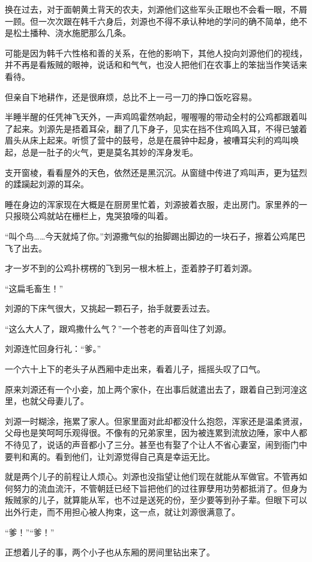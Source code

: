 换在过去，对于面朝黄土背天的农夫，刘源他们这些军头正眼也不会看一眼，不屑一顾。但一次次跟在韩千六身后，刘源也不得不承认种地的学问的确不简单，绝不是松土播种、浇水施肥那么几条。

可能是因为韩千六性格和善的关系，在他的影响下，其他人投向刘源他们的视线，并不再是看叛贼的眼神，说话和和气气，也没人把他们在农事上的笨拙当作笑话来看待。

但亲自下地耕作，还是很麻烦，总比不上一弓一刀的挣口饭吃容易。

半睡半醒的任凭神飞天外，一声鸡鸣霍然响起，喔喔喔的带动全村的公鸡都跟着叫了起来。刘源先是捂着耳朵，翻了几下身子，见实在挡不住鸡鸣入耳，不得已皱着眉头从床上起来。听惯了营中的鼓号，总是在晨钟中起身，被嘈耳尖利的鸡叫唤起，总是一肚子的火气，更是莫名其妙的浑身发毛。

支开窗棱，看看屋外的天色，依然还是黑沉沉。从窗缝中传进了鸡叫声，更为猛烈的蹂躏起刘源的耳朵。

睡在身边的浑家现在大概是在厨房里忙着，刘源披着衣服，走出房门。家里养的一只报晓公鸡就站在栅栏上，鬼哭狼嚎的叫着。

“叫个鸟……今天就炖了你。”刘源撒气似的抬脚踢出脚边的一块石子，擦着公鸡尾巴飞了出去。

才一岁不到的公鸡扑楞楞的飞到另一根木桩上，歪着脖子盯着刘源。

“这扁毛畜生！”

刘源的下床气很大，又挑起一颗石子，抬手就要丢过去。

“这么大人了，跟鸡撒什么气？”一个苍老的声音叫住了刘源。

刘源连忙回身行礼：“爹。”

一个六十上下的老头子从西厢中走出来，看着儿子，摇摇头叹了口气。

原来刘源还有一个小妾，加上两个家仆，在出事后就遣出去了，跟着自己到河湟这里，也就父母妻儿了。

刘源一时糊涂，拖累了家人。但家里面对此却都没什么抱怨，浑家还是温柔贤淑，父母也是笑呵呵乐观得很。不像有的兄弟家里，因为被连累到流放边陲，家中人都不待见了，说话的声音都小了三分。甚至也有娶了个让人不省心妻室，闹到衙门中要判和离的。看到他们，让刘源觉得自己真是幸运无比。

就是两个儿子的前程让人烦心。刘源也没指望让他们现在就能从军做官。不管再如何努力的流血流汗，不管朝廷已经下旨把他们的过往罪孽用功劳都抵消了。但身为叛贼家的儿子，就算能从军，也不过是送死的份，至少要等到孙子辈。但眼下可以出外行走，而不用担心被人拘束，这一点，就让刘源很满意了。

“爹！”“爹！”

正想着儿子的事，两个小子也从东厢的房间里钻出来了。

